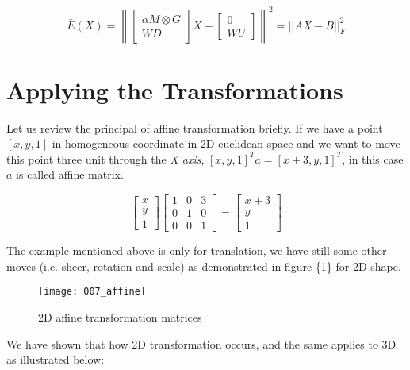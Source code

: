 \documentclass[../structure.tex]{subfiles}
\begin{document}
\begin{equation}
\bar{E}(X) = \left\|
\begin{bmatrix}
\alpha M \otimes G \\ WD
\end{bmatrix}
X -
\begin{bmatrix}
0 \\ WU
\end{bmatrix}
\right\| ^2 = ||AX - B||_{F}^2
\end{equation}

\section{Applying the Transformations}
Let us review the principal of affine transformation briefly. If we have a point $[x,y,1]$ in homogeneous coordinate in 2D euclidean space and we want to move this point three unit through the \textit{X axis}, $[x,y,1]^T a = [x+3,y,1]^T$, in this case $a$ is called affine matrix.

\begin{equation*}
\begin{bmatrix}
x \\ y \\ 1
\end{bmatrix}
\begin{bmatrix}
1 & 0 & 3 \\
0 & 1 & 0 \\
0 & 0 & 1
\end{bmatrix}
=
\begin{bmatrix}
x + 3 \\ y \\ 1
\end{bmatrix}
\end{equation*}

The example mentioned above is only for translation, we have still some other moves (i.e. sheer, rotation and scale) as demonstrated in figure \{\ref{fig:affine}\} for 2D shape.

\begin{figure}[h!]
\centering
\texttt{[image: 007\_affine]}
\captionsetup{justification=centering}
\caption{2D affine transformation matrices \cite{Wikipedia2016}}
\label{fig:affine}
\end{figure}

We have shown that how 2D transformation occurs, and the same applies to 3D as illustrated below:
\end{document}

